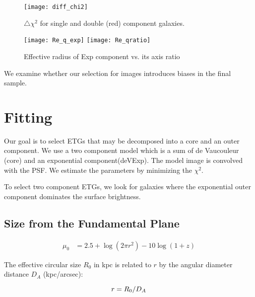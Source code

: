 \documentclass[iop]{emulateapj}
\newcommand{\chisq}{\ensuremath{\chi^2}}
\newcommand\todo[1]{\textcolor{red}{#1}}
\begin{document}
\begin{figure}[]
    \begin{center}
        \texttt{[image: diff\_chi2]}
    \end{center}
    \caption{$\triangle\chisq$ for single and double (red) component galaxies.}
    \label{fig:DiffChisq}
\end{figure}

\begin{figure*}[]
    \begin{center}
        \texttt{[image: Re\_q\_exp]}
        \texttt{[image: Re\_qratio]}
    \end{center}
    \caption{Effective radius of Exp component vs. its axis ratio}
    \label{fig:Req}
\end{figure*}

We examine whether our selection for images introduces biases
in the final sample.

\section{Fitting}

Our goal is to select ETGs that may be decomposed into a core and an outer
component.
We use a two component model which is a sum of de Vaucouleur (core)
and an exponential component(deVExp).
The model image is convolved with the PSF.
We estimate the parameters by minimizing the \chisq.

To select two component ETGs, we look for galaxies where the exponential
outer component dominates the surface brightness. 

\subsection{Size from the Fundamental Plane}
\todo{}



\begin{eqnarray}
       \mu_0 &= 2.5 + \log(2 \pi r^2) - 10 \log(1+z)
\end{eqnarray}

The effective circular size $R_0$ in kpc is related to $r$ by
the angular diameter distance $D_A$ (kpc/arcsec):

\begin{equation}
    r = R_0 / D_A \\
\end{equation}
\end{document}
